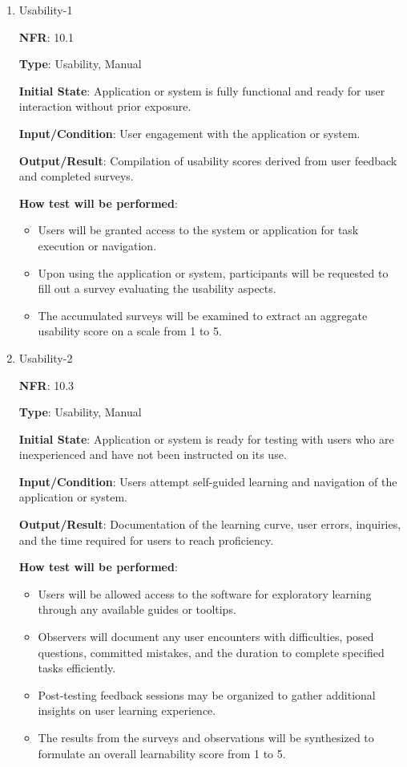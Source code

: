 \documentclass[12pt, titlepage]{article}
\begin{document}
\begin{enumerate}

\item{Usability-1\\}

\textbf{NFR}: 10.1

\textbf{Type}: Usability, Manual

\textbf{Initial State}: Application or system is fully functional and ready for user interaction without prior exposure.

\textbf{Input/Condition}: User engagement with the application or system.

\textbf{Output/Result}: Compilation of usability scores derived from user feedback and completed surveys.

\textbf{How test will be performed}:

\begin{itemize}
    \item Users will be granted access to the system or application for task execution or navigation.
    \item Upon using the application or system, participants will be requested to fill out a survey evaluating the usability aspects.
    \item The accumulated surveys will be examined to extract an aggregate usability score on a scale from 1 to 5.
\end{itemize}

\item{Usability-2\\}

\textbf{NFR}: 10.3

\textbf{Type}: Usability, Manual

\textbf{Initial State}: Application or system is ready for testing with users who are inexperienced and have not been instructed on its use.

\textbf{Input/Condition}: Users attempt self-guided learning and navigation of the application or system.

\textbf{Output/Result}: Documentation of the learning curve, user errors, inquiries, and the time required for users to reach proficiency.

\textbf{How test will be performed}:

\begin{itemize}
    \item Users will be allowed access to the software for exploratory learning through any available guides or tooltips.
    \item Observers will document any user encounters with difficulties, posed questions, committed mistakes, and the duration to complete specified tasks efficiently.
    \item Post-testing feedback sessions may be organized to gather additional insights on user learning experience.
    \item The results from the surveys and observations will be synthesized to formulate an overall learnability score from 1 to 5.
\end{itemize}


\end{enumerate}
\end{document}
